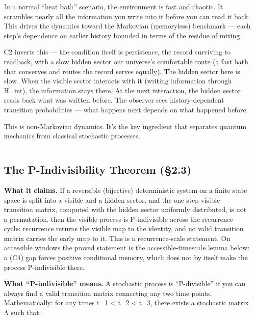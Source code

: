 \documentclass[
]{article}
\begin{document}
In a normal ``heat bath'' scenario, the environment is fast and chaotic.
It scrambles nearly all the information you write into it before you can
read it back. This drives the dynamics toward the Markovian (memoryless)
benchmark --- each step's dependence on earlier history bounded in terms
of the residue of mixing.

C2 inverts this --- the condition itself is persistence, the record
surviving to readback, with a slow hidden sector our universe's
comfortable route (a fast bath that conserves and routes the record
serves equally). The hidden sector here is slow. When the visible sector
interacts with it (writing information through H\_int), the information
stays there. At the next interaction, the hidden sector reads back what
was written before. The observer sees history-dependent transition
probabilities --- what happens next depends on what happened before.

This is non-Markovian dynamics. It's the key ingredient that separates
quantum mechanics from classical stochastic processes.

\begin{center}\rule{0.5\linewidth}{0.5pt}\end{center}

\hypertarget{the-p-indivisibility-theorem-2.3}{%
\subsection{The P-Indivisibility Theorem
(§2.3)}\label{the-p-indivisibility-theorem-2.3}}

\textbf{What it claims.} If a reversible (bijective) deterministic
system on a finite state space is split into a visible and a hidden
sector, and the one-step visible transition matrix, computed with the
hidden sector uniformly distributed, is not a permutation, then the
visible process is P-indivisible across the recurrence cycle: recurrence
returns the visible map to the identity, and no valid transition matrix
carries the early map to it. This is a recurrence-scale statement. On
accessible windows the proved statement is the accessible-timescale
lemma below: a (C4) gap forces positive conditional memory, which does
not by itself make the process P-indivisible there.

\textbf{What ``P-indivisible'' means.} A stochastic process is
``P-divisible'' if you can always find a valid transition matrix
connecting any two time points. Mathematically: for any times t\_1
\textless{} t\_2 \textless{} t\_3, there exists a stochastic matrix Λ
such that:
\end{document}

